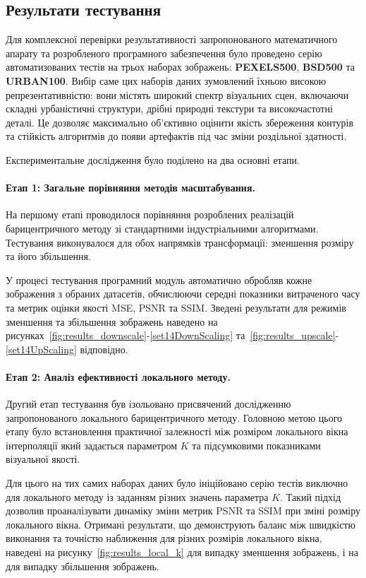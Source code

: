 \subsection{Результати тестування}

Для комплексної перевірки результативності запропонованого математичного апарату та розробленого програмного забезпечення було проведено серію автоматизованих тестів на трьох наборах зображень: \textbf{PEXELS500}, \textbf{BSD500} та \textbf{URBAN100}. Вибір саме цих наборів даних зумовлений їхньою високою репрезентативністю: вони містять широкий спектр візуальних сцен, включаючи складні урбаністичні структури, дрібні природні текстури та високочастотні деталі. Це дозволяє максимально об'єктивно оцінити якість збереження контурів та стійкість алгоритмів до появи артефактів під час зміни роздільної здатності.

Експериментальне дослідження було поділено на два основні етапи.

\paragraph{Етап 1: Загальне порівняння методів масштабування.}
На першому етапі проводилося порівняння розроблених реалізацій барицентричного методу зі стандартними індустріальними алгоритмами. Тестування виконувалося для обох напрямків трансформації: зменшення розміру та його збільшення. 

У процесі тестування програмний модуль автоматично обробляв кожне зображення з обраних датасетів, обчислюючи середні показники витраченого часу та метрик оцінки якості MSE, PSNR та SSIM. Зведені результати для режимів зменшення та збільшення зображень наведено на рисунках~\ref{fig:results_downscale}-\ref{set14DownScaling} та~\ref{fig:results_upscale}-\ref{set14UpScaling} відповідно.

\paragraph{Етап 2: Аналіз ефективності локального методу.}
Другий етап тестування був ізольовано присвячений дослідженню запропонованого локального барицентричного методу. Головною метою цього етапу було встановлення практичної залежності між розміром локального вікна інтерполяції який задається параметром $K$ та підсумковими показниками візуальної якості.

Для цього на тих самих наборах даних було ініційовано серію тестів виключно для локального методу із заданням різних значень параметра $K$. Такий підхід дозволив проаналізувати динаміку зміни метрик PSNR та SSIM при зміні розміру локального вікна. Отримані результати, що демонструють баланс між швидкістю виконання та точністю наближення для різних розмірів локального вікна, наведені на рисунку~\ref{fig:results_local_k} для випадку зменшення зображень, і на для випадку збільшення зображень.

